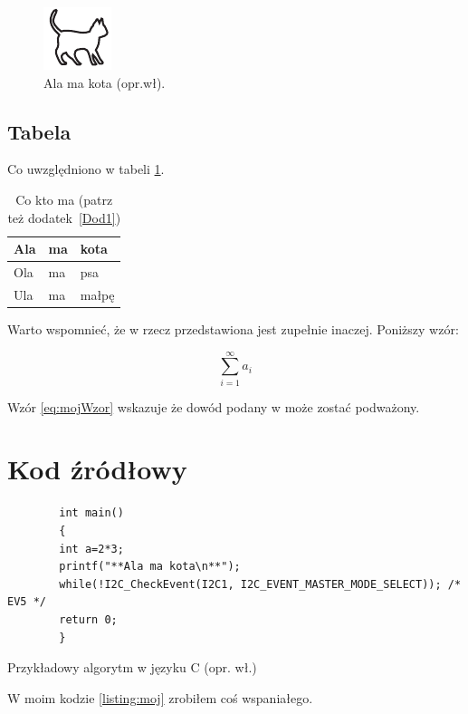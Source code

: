 \begin{figure}[H]
    \centering\includegraphics[width=.4\textwidth]{img/kotek}
    \caption{Ala ma kota (opr.wł).}\label{rysunek:kot}
\end{figure}

\subsection{Tabela}

Co uwzględniono w tabeli \ref{tabela:coktoma}. \lipsum[13-15]

\begin{table}[h!]
    \centering\caption{Co kto ma\cite{harel_rzecz_2008} (patrz też dodatek~\ref{Dod1}) \label{tabela:coktoma}}
    \begin{tabular}{|l|l|l|}%
        \hline
        Ala & ma & kota \\
        \hline
        Ola & ma & psa \\
        \hline
        Ula & ma & małpę\\
        \hline
    \end{tabular}
\end{table}

\lipsum[19-20] Warto wspomnieć, że w\cite{aizawa_groundwater_2009} rzecz przedstawiona jest zupełnie inaczej. Poniższy wzór:

\begin{equation}
    \sum_{i=1}^{\infty}a_i
    \label{eq:mojWzor}
\end{equation}

Wzór \ref{eq:mojWzor} wskazuje że dowód podany w\cite{kaleta_experimental_2005} może zostać podważony. \lipsum[9]

\section{Kod źródłowy}

\begin{listing}[h!]
    \begin{verbatim}
        int main()
        {
        int a=2*3;
        printf("**Ala ma kota\n**");
        while(!I2C_CheckEvent(I2C1, I2C_EVENT_MASTER_MODE_SELECT)); /* EV5 */
        return 0;
        }
    \end{verbatim}
    \caption{Przykładowy algorytm w języku C (opr. wł.)} \label{listing:moj}
\end{listing}

W moim kodzie \ref{listing:moj} zrobiłem coś wspaniałego. \lipsum[4]

\thispagestyle{normal}
